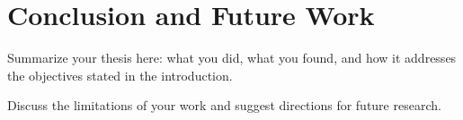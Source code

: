 \section{Conclusion and Future Work}

\noindent\hspace*{\parindent} Summarize your thesis here: what you did, what you found, and how it addresses the objectives stated in the introduction.

\noindent\hspace*{\parindent} Discuss the limitations of your work and suggest directions for future research.
